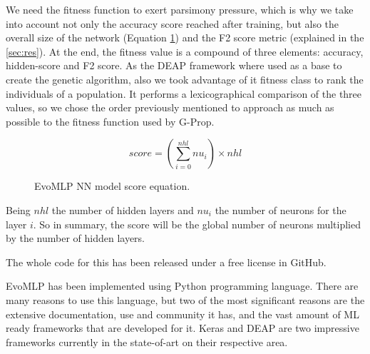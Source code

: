 \documentclass[runningheads]{llncs}
\begin{document}
\begin{itemize}
\end{itemize}

We need the fitness function to exert parsimony pressure, which is why
we take into account not only the accuracy score reached after
training, but also the overall size of the network (Equation
\ref{eq:hidden-score}) and the F2 score metric (explained in the
\autoref{sec:res}). At the end, the fitness value is a compound of
three elements: accuracy, hidden-score and F2 score. As the DEAP framework
\cite{deap-ga} where used as a base to create the genetic algorithm, also we
took advantage of it fitness class \cite{deap-fitness} to rank the individuals
of a population. It performs a lexicographical comparison of the three values,
so we chose the order previously mentioned to approach as much as possible to
the fitness function used by G-Prop.


\begin{figure}
    \centering
    \caption{
        {\sf EvoMLP} NN model score equation.
    }
    \label{eq:hidden-score}
    \begin{equation}
        score = (\sum_{i=0}^{nhl} nu_{i}) \times nhl
    \end{equation}
\end{figure}

Being $nhl$ the number of hidden layers and $nu_{i}$ the number
of neurons for the layer $i$. So in summary, the score will be the
global number of neurons multiplied by the number of hidden layers.

The whole code for this has been released under a free license in
GitHub. %

{\sf EvoMLP} has been implemented using Python programming language. There are
many reasons to use this language, but two of the most significant reasons are
the extensive documentation, use and community it has, and the vast amount of
ML ready frameworks that are developed for it. Keras and DEAP are two impressive
frameworks currently in the state-of-art on their respective area.
\end{document}
